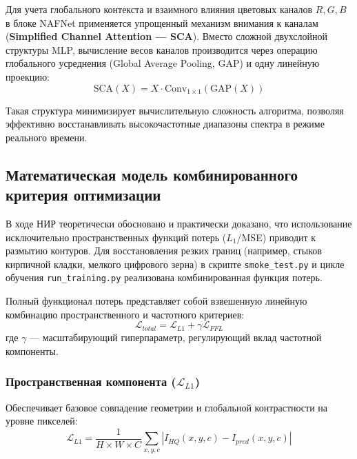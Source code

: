 \documentclass[12pt,a4paper]{article}
\begin{document}
Для учета глобального контекста и взаимного влияния цветовых каналов $R, G, B$ в блоке NAFNet применяется упрощенный механизм внимания к каналам (\textbf{Simplified Channel Attention --- SCA}). Вместо сложной двухслойной структуры MLP, вычисление весов каналов производится через операцию глобального усреднения (Global Average Pooling, GAP) и одну линейную проекцию:
\begin{equation}
    \text{SCA}(X) = X \cdot \text{Conv}_{1\times1}(\text{GAP}(X))
\end{equation}

Такая структура минимизирует вычислительную сложность алгоритма, позволяя эффективно восстанавливать высокочастотные диапазоны спектра в режиме реального времени.

\subsection{Математическая модель комбинированного критерия оптимизации}
В ходе НИР теоретически обосновано и практически доказано, что использование исключительно пространственных функций потерь ($L_1$/MSE) приводит к размытию контуров. Для восстановления резких границ (например, стыков кирпичной кладки, мелкого цифрового зерна) в скрипте \texttt{smoke\_test.py} и цикле обучения \texttt{run\_training.py} реализована комбинированная функция потерь.

Полный функционал потерь представляет собой взвешенную линейную комбинацию пространственного и частотного критериев:
\begin{equation}
    \mathcal{L}_{total} = \mathcal{L}_{L1} + \gamma \mathcal{L}_{FFL}
\end{equation}
где $\gamma$ --- масштабирующий гиперпараметр, регулирующий вклад частотной компоненты.

\subsubsection{Пространственная компонента ($\mathcal{L}_{L1}$)}
Обеспечивает базовое совпадение геометрии и глобальной контрастности на уровне пикселей:
\begin{equation}
    \mathcal{L}_{L1} = \frac{1}{H \times W \times C}\sum_{x,y,c} \left| I_{HQ}(x,y,c) - I_{pred}(x,y,c) \right|
\end{equation}
\end{document}
